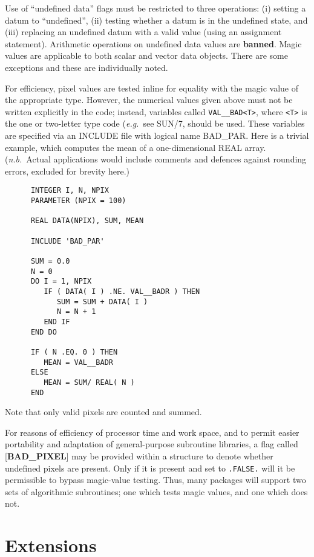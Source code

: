 \documentclass[twoside,11pt]{article}
\newcommand{\xref}[3]{#1}
\newcommand{\xlabel}[1]{}
\begin{document}
Use of ``undefined data'' flags must be restricted to three operations:
(i) setting a datum to ``undefined'', (ii) testing whether a datum is
in the undefined state, and (iii) replacing an undefined datum with a
valid value (using an assignment statement).  Arithmetic operations on
undefined data values are {\bf banned}.  Magic values are applicable to both
scalar and vector data objects.  There are some exceptions and these
are individually noted.

For efficiency, pixel values are tested inline for equality with the
magic value of the appropriate type.  However, the numerical values
given above must not be written explicitly in the code; instead,
variables called {\tt VAL\_\_BAD<T>}, where {\tt <T>} is the one or two-letter
type code ({\it e.g.}\  see \xref{SUN/7}{sun7}), should
be used.  These variables are specified
via an INCLUDE file with logical name BAD\_PAR.  Here is a trivial
example, which computes the mean of a one-dimensional REAL array.
({\it n.b.}\ Actual applications would include comments and
defences against rounding errors, excluded for brevity here.)

\goodbreak
\begin{verbatim}
      INTEGER I, N, NPIX
      PARAMETER (NPIX = 100)

      REAL DATA(NPIX), SUM, MEAN

      INCLUDE 'BAD_PAR'

      SUM = 0.0
      N = 0
      DO I = 1, NPIX
         IF ( DATA( I ) .NE. VAL__BADR ) THEN
            SUM = SUM + DATA( I )
            N = N + 1
         END IF
      END DO

      IF ( N .EQ. 0 ) THEN
         MEAN = VAL__BADR
      ELSE
         MEAN = SUM/ REAL( N )
      END
\end{verbatim}

Note that only valid pixels are counted and summed.

For reasons of efficiency of processor time and work space, and to
permit easier portability and adaptation of general-purpose subroutine
libraries, a flag called {[}{\bf BAD\_PIXEL}{]} may be
provided within a structure
to denote whether undefined pixels are present.  Only if it is present
and set to {\tt .FALSE.} will it be
permissible to bypass magic-value testing.  Thus, many packages
will support two sets of algorithmic subroutines; one which
tests magic values, and one which does not. 

\section{\xlabel{se_exten}Extensions\label{se:exten}}
\end{document}

